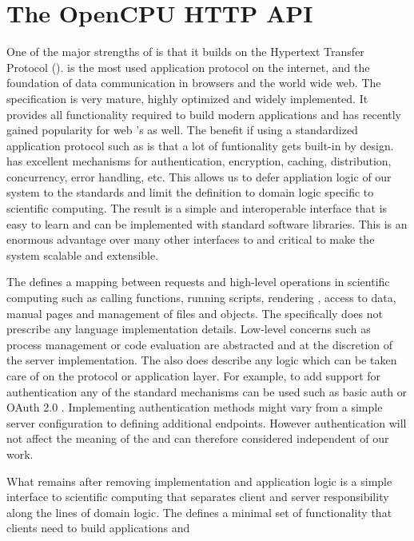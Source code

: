 \section{The OpenCPU HTTP API}

One of the major strengths of \OpenCPU is that it builds on the Hypertext Transfer Protocol (\HTTP). \HTTP is the most used application protocol on the internet, and the foundation of data communication in browsers and the world wide web. The \HTTP specification is very mature, highly optimized and widely implemented. It provides all functionality required to build modern applications and has recently gained popularity for web \API's as well. The benefit if using a standardized application protocol such as \HTTP is that a lot of funtionality gets built-in by design. \HTTP has excellent mechanisms for authentication, encryption, caching, distribution, concurrency, error handling, etc. This allows us to defer appliation logic of our system to the \HTTP standards and limit the \OpenCPU \API definition to domain logic specific to scientific computing. The result is a simple and interoperable interface that is easy to learn and can be implemented with standard \HTTP software libraries. This is an enormous advantage over many other interfaces to \R and critical to make the system scalable and extensible. 

The \OpenCPU \API defines a mapping between \HTTP requests and high-level operations in scientific computing such as calling functions, running scripts, rendering \Latex, access to data, manual pages and management of files and objects. The \API specifically does not prescribe any language implementation details. Low-level concerns such as process management or code evaluation are abstracted and at the discretion of the server implementation. The \API also does describe any logic which can be taken care of on the protocol or application layer. For example, to add support for authentication any of the standard mechanisms can be used such as \HTTP basic auth \citep{franks1999rfc} or OAuth 2.0 \citep{hardt2012oauth}. Implementing authentication methods might vary from a simple server configuration to defining additional endpoints. However authentication will not affect the meaning of the \API and can therefore considered independent of our work.

What remains after removing implementation and application logic is a simple interface to scientific computing that separates client and server responsibility along the lines of domain logic. The \OpenCPU \API defines a minimal set of functionality that clients need to build applications and  



